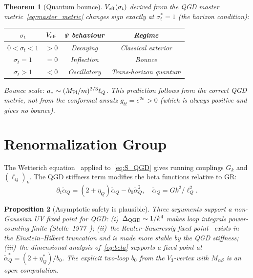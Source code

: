 \documentclass[11pt,a4paper]{article}
\theoremstyle{plain}
\newtheorem{theorem}{Theorem}[section]
\newtheorem{proposition}[theorem]{Proposition}
\theoremstyle{definition}
\theoremstyle{remark}
\newcommand{\lQ}{\ell_Q}
\newcommand{\sigt}{\sigma_t}
\begin{document}
\begin{theorem}[Quantum bounce]\label{thm:bounce}
$V_{\rm eff}(\sigt)$ derived from the QGD master metric~\eqref{eq:master_metric}
changes sign exactly at $\sigt^*=1$ (the horizon condition):

\begin{center}
\renewcommand{\arraystretch}{1.2}
\begin{tabular}{@{}cccc@{}}
\toprule
$\sigt$ & $V_{\rm eff}$ & $\Psi$ behaviour & Regime \\
\midrule
$0<\sigt<1$ & $>0$ & Decaying & Classical exterior \\
$\sigt=1$ & $=0$ & Inflection & Bounce \\
$\sigt>1$ & $<0$ & Oscillatory & Trans-horizon quantum \\
\bottomrule
\end{tabular}
\end{center}
Bounce scale: $a_*\sim(M_{\rm Pl}/m)^{2/3}\lQ$.
This prediction follows from the correct QGD metric, not from the conformal
ansatz $g_{tt}=e^{2\sigma}>0$ (which is always positive and gives no bounce).
\end{theorem}

\section{Renormalization Group}
\label{sec:RG}

The Wetterich equation~\cite{Wetterich1993} applied to~\eqref{eq:S_QGD}
gives running couplings $G_k$ and $(\lQ)_k$.  The QGD stiffness term
modifies the beta functions relative to GR:
\begin{equation}
  \partial_t\tilde\alpha_Q = (2+\eta_Q)\tilde\alpha_Q - b_0\tilde\alpha_Q^2,
  \quad \tilde\alpha_Q = Gk^2/\lQ^2.
  \label{eq:beta}
\end{equation}

\begin{proposition}[Asymptotic safety is plausible]\label{prop:AS}
Three arguments support a non-Gaussian UV fixed point for QGD:
(i)~$\Delta_{\rm QGD}\sim1/k^4$ makes loop integrals power-counting finite
(Stelle~1977~\cite{Stelle1977});
(ii)~the Reuter--Saueressig fixed point~\cite{Reuter1998} exists in the
Einstein--Hilbert truncation and is made more stable by the QGD stiffness;
(iii)~the dimensional analysis of~\eqref{eq:beta} supports a
fixed point at $\tilde\alpha_Q^*=(2+\eta_Q^*)/b_0$.
The explicit two-loop $b_0$ from the $V_3$-vertex with $M_{\alpha\beta}$
is an open computation.
\end{proposition}
\end{document}
